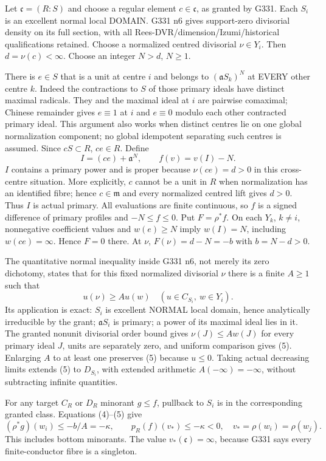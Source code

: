 \documentclass[11pt]{article}
\begin{document}
Let $\mathfrak c=(R:S)$ and choose a regular element $c\in\mathfrak c$,
as granted by G331. Each $S_i$ is an excellent normal local DOMAIN.
G331 n6 gives support-zero divisorial density on its full section, with
all Rees-DVR/dimension/Izumi/historical qualifications retained. Choose a
normalized centred divisorial $\nu\in Y_i$. Then $d=\nu(c)<\infty$.
Choose an integer $N>d$, $N\ge1$.

There is $e\in S$ that is a unit at centre $i$ and belongs to
$(\mathfrak aS_k)^N$ at EVERY other centre $k$. Indeed the contractions to
$S$ of those primary ideals have distinct maximal radicals. They and the
maximal ideal at $i$ are pairwise comaximal; Chinese remainder gives
$e\equiv1$ at $i$ and $e\equiv0$ modulo each other contracted primary
ideal. This argument also works when distinct centres lie on one global
normalization component; no global idempotent separating such centres is
assumed. Since $cS\subset R$, $ce\in R$. Define
\[
       I=(ce)+\mathfrak a^N,\qquad f(v)=v(I)-N.           \tag{4}
\]
$I$ contains a primary power and is proper because $\nu(ce)=d>0$ in
this cross-centre situation. More explicitly, $c$ cannot be a unit in $R$
when normalization has an identified fibre; hence $c\in\mathfrak m$
and every normalized centred lift gives $d>0$. Thus $I$ is actual primary.
All evaluations are finite continuous, so $f$ is a signed difference of
primary profiles and $-N\le f\le0$. Put $F=\rho^*f$. On each $Y_k$,
$k\ne i$, nonnegative coefficient values and $w(e)\ge N$ imply
$w(I)=N$, including $w(ce)=\infty$. Hence $F=0$ there. At $\nu$,
$F(\nu)=d-N=-b$ with $b=N-d>0$.

The quantitative normal inequality inside G331 n6, not merely its zero
dichotomy, states that for this fixed normalized divisorial $\nu$ there
is a finite $A\ge1$ such that
\[
                  u(\nu)\ge A u(w)\quad
       (u\in C_{S_i},\ w\in Y_i).                       \tag{5}
\]
Its application is exact: $S_i$ is excellent NORMAL local domain, hence
analytically irreducible by the grant; $\mathfrak aS_i$ is primary; a
power of its maximal ideal lies in it. The granted nonunit divisorial
order bound gives $\nu(J)\le A w(J)$ for every primary ideal $J$, units
are separately zero, and uniform comparison gives (5). Enlarging $A$ to
at least one preserves (5) because $u\le0$. Taking actual decreasing
limits extends (5) to $D_{S_i}$, with extended arithmetic $A(-\infty)
=-\infty$, without subtracting infinite quantities.

For any target $C_R$ or $D_R$ minorant $g\le f$, pullback to $S_i$ is in
the corresponding granted class. Equations (4)--(5) give
\[
        (\rho^*g)(w_i)\le-b/A=-\kappa,\qquad
        p_R(f)(v_*)\le-\kappa<0,\quad v_*=\rho(w_i)=\rho(w_j).
                                                               \tag{6}
\]
This includes bottom minorants. The value $v_*(\mathfrak c)=\infty$,
because G331 says every finite-conductor fibre is a singleton.
\end{document}
